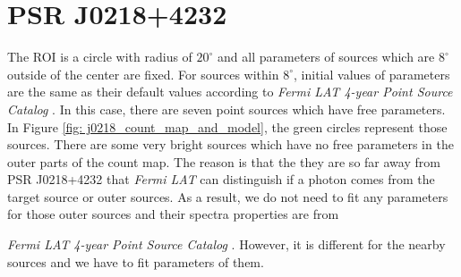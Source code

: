 \documentclass[12pt]{report}
\newcommand{\mycaption}[1]{\protect \caption{#1}}
\newcommand{\fgl}[0]{
  \textit{Fermi LAT 4-year Point Source Catalog}
}
\begin{document}
          \begin{table}[!ht]
            \centering
            \mycaption{Fit results with data from year 2009 to year 2018. The physical 
              meanings of $\Gamma$ and $E_c$ are the same as Table 
              \ref{table: previous_result_comparison}}
            \label{table: 2018_fit_data}
          \end{table}
          \vspace{1cm}            

        \section{PSR J0218+4232}
          The ROI is a circle with radius of $20^\circ$ and all parameters of sources which 
          are $8^\circ$ outside of the center are fixed. For sources within $8^\circ$, initial
          values of parameters are the same as their default values according to \fgl.
          In this case, there are seven point sources which have free parameters. In Figure
          \ref{fig: j0218_count_map_and_model}, the green circles represent those sources.
          There are some very bright sources which have no free parameters
          in the outer parts of the count map. The reason is that the they are so far away 
          from PSR J0218+4232 that \textit{Fermi LAT} can distinguish if a photon comes 
          from the target source or outer sources. As a result, we do not need to fit 
          any parameters for those outer sources and their spectra properties are from 
          \fgl. However, it is different for the nearby sources and we have to fit parameters
          of them.
          
\end{document}
